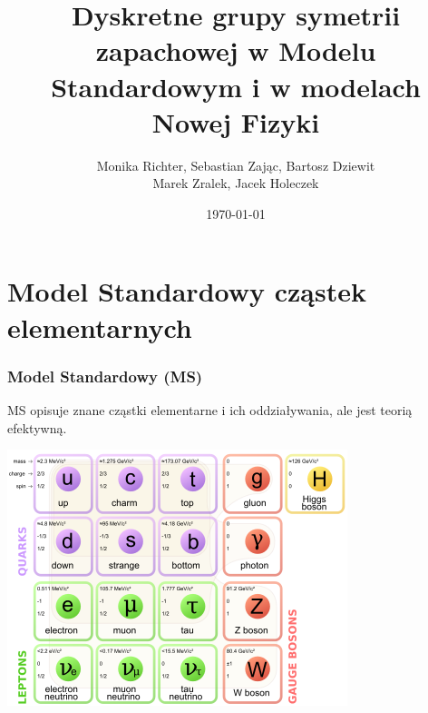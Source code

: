 \documentclass[11pt]{beamer}
\begin{document}
	\author[M.R, S.Z, B.D, M.Z, J.H.]{Monika Richter, Sebastian Zając, Bartosz Dziewit \\ Marek Zralek, Jacek Holeczek}
	\title[Symetria zapachowa w MS i poza MS]{Dyskretne grupy symetrii zapachowej w Modelu Standardowym i w modelach Nowej Fizyki}
	\date{\today}
	\begin{frame}	
			\maketitle
	\end{frame}
		
\section{Model Standardowy cząstek elementarnych}
\begin{frame}
\frametitle{Model Standardowy (MS)}
MS opisuje znane cząstki elementarne i ich oddziaływania, ale jest teorią efektywną.
\begin{center}
\includegraphics[scale=0.5]{SM.png}
\end{center}
\end{frame}
\end{document}
